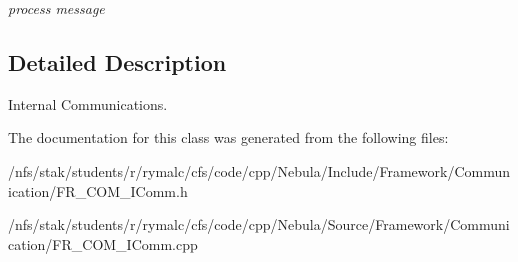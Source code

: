 \begin{DoxyCompactItemize}
\begin{DoxyCompactList}\small\item\em process message \item\end{DoxyCompactList}\end{DoxyCompactItemize}


\subsection{Detailed Description}
Internal Communications. 

The documentation for this class was generated from the following files:\begin{DoxyCompactItemize}
\item 
/nfs/stak/students/r/rymalc/cfs/code/cpp/Nebula/Include/Framework/Communication/FR\_\-COM\_\-IComm.h\item 
/nfs/stak/students/r/rymalc/cfs/code/cpp/Nebula/Source/Framework/Communication/FR\_\-COM\_\-IComm.cpp\end{DoxyCompactItemize}
